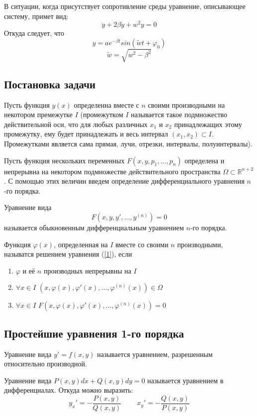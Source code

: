 В ситуации, когда присутствует сопротивление среды уравнение, описывающее систему, примет вид:
$$\ddot{y} + 2 \beta \dot{y} +w^2y = 0$$
Откуда следует, что
$$y=a e^{-\beta t}sin( \widetilde{w}t +\varphi_0)$$
$$\widetilde{w}=\sqrt{w^2-\beta^2}$$

\subsection{Постановка задачи}
Пусть функция $y(x)$ определенна вместе с $n$ своими производными на некотором премежутке $I$ (промежутком $I$ называется такое подмножество действительной оси, что для любых различных $x_1$ и $x_2$ принадлежащих этому промежутку, ему будет принадлежать и весь интервал $(x_1, x_2) \subset I$. Промежутками является сама прямая, лучи, отрезки, интервалы, полуинтервалы).

Пусть функция нескольких переменных $F(x,y,p_1,\ldots,p_n)$ определена и непрерывна на некотором подмножестве действительного пространства $\Omega \subset \mathbb{R}^{n+2}$. С помощью этих величин введем определение дифференциального уравнения $n$-го порядка.

\begin{Def}
Уравнение вида
\begin{equation}\label{1}
    F(x, y, y', \ldots, y^{(n)}) = 0
\end{equation}
называется обыкновенным дифференциальным уравнением $n$-го порядка.
\end{Def}
\begin{Def}
Функция $\varphi(x)$, определенная на $I$ вместе со своими $n$ производными, называтся решением уравнения (\ref{1}), если
\begin{enumerate}
    \item $\varphi$ и её $n$ производных непрерывны на $I$
    \item $\forall x \in I$ $(x, \varphi(x), \varphi'(x), \ldots, \varphi^{(n)}(x)) \in \Omega$
    \item $\forall x \in I$ $F(x, \varphi(x), \varphi'(x), \ldots, \varphi^{(n)}(x))=0$
\end{enumerate}
\end{Def}

\subsection{Простейшие уравнения 1-го порядка}
\begin{Def}
Уравнение вида $y'=f(x,y)$ называется уравнением, разрешенным относительно производной.
\end{Def}
\begin{Def}
Уравнение вида $P(x,y)dx +Q(x,y)dy=0$ называется уравнением в дифференциалах. Откуда можно выразить:
$$y_x'=-\frac{P(x,y)}{Q(x,y)}\;\;\;\;\;\;\;\; x_y'=-\frac{Q(x,y)}{P(x,y)}$$
\end{Def}
